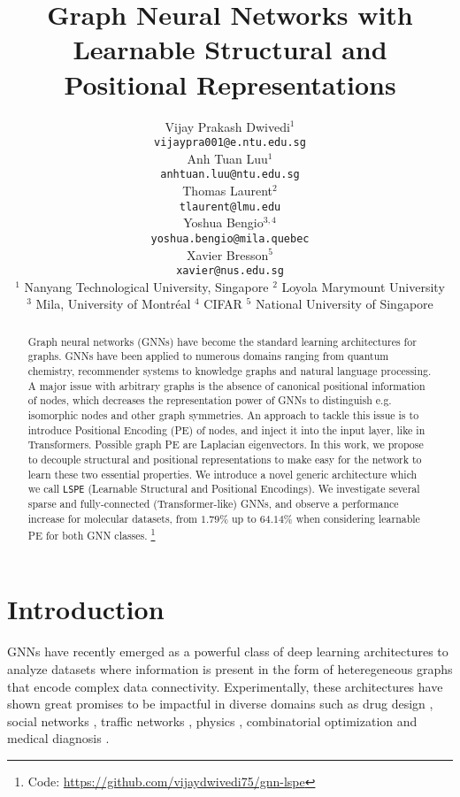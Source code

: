 \documentclass{article} \usepackage{iclr2021_conference,times}
\title{Graph Neural Networks with Learnable Structural and Positional Representations}
\author{Vijay Prakash Dwivedi$^{1}$ \\
  \texttt{vijaypra001@e.ntu.edu.sg} \\
  \And
  Anh Tuan Luu$^1$ \\
  \texttt{anhtuan.luu@ntu.edu.sg} \\
  \And
  Thomas Laurent$^2$ \\
  \texttt{tlaurent@lmu.edu} \\
  \And
  Yoshua Bengio$^{3,4}$ \\
  \texttt{yoshua.bengio@mila.quebec} \\
  \And
  Xavier Bresson$^5$ \\
  \texttt{xavier@nus.edu.sg} \\
  \AND
  {\normalfont $^1$ Nanyang Technological University, Singapore \hspace{0.18cm} $^2$ Loyola Marymount University} \\
  $^3$ Mila, University of Montr\'eal \hspace{0.18cm} $^4$ CIFAR \hspace{0.14cm} $^5$ National University of Singapore
}
\begin{document}
\maketitle



\begin{abstract}
Graph neural networks (GNNs) have become the standard learning architectures for graphs.
GNNs have been applied to numerous domains ranging from quantum chemistry, recommender systems to knowledge graphs and natural language processing. A major issue with arbitrary graphs is the absence of canonical positional information of nodes, which decreases the representation power of GNNs to distinguish e.g. isomorphic nodes and other graph symmetries. An approach to tackle this issue is to introduce Positional Encoding (PE) of nodes, and inject it into the input layer, like in Transformers. Possible graph PE are Laplacian eigenvectors. In this work, we propose to decouple structural and positional representations to make easy for the network to learn these two essential properties. We introduce a novel generic architecture which we call \texttt{LSPE} (Learnable Structural and Positional Encodings). We investigate several sparse and fully-connected (Transformer-like) GNNs, and observe a performance increase for molecular datasets, from 
$1.79\%$
up to $64.14\%$
when considering learnable PE for both GNN classes.
\footnote{Code:  \url{https://github.com/vijaydwivedi75/gnn-lspe}}
\end{abstract}

\section{Introduction}
\label{sec:introduction}

GNNs have recently emerged as a powerful class of deep learning architectures to analyze datasets where information is present in the form of heteregeneous graphs that encode complex data connectivity. Experimentally, these architectures have 
shown great promises to be impactful in diverse domains such as drug design \citep{stokes2020deep, gaudelet2020utilising}, social networks \citep{monti2019fake, pal2020pinnersage}, traffic networks \citep{derrowpinion2021traffic}, physics \citep{cranmer2019learning, bapst2020unveiling}, combinatorial optimization \citep{bengio2021machine,cappart2021combinatorial} and medical diagnosis \citep{li2020graph}. 
\end{document}
